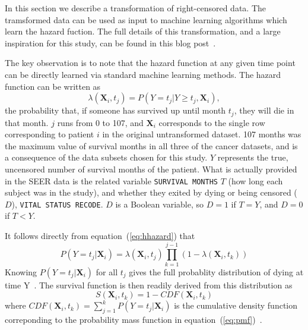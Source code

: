 \documentclass[10pt,letterpaper]{article}
\newcommand{\codewhite}[1]{\colorbox{white}{\texttt{#1}}}
\begin{document}
In this section we describe a transformation of right-censored data. The tramsformed data can be used as input to machine learning algorithms which learn the hazard fuction. The full details of this transformation, and a large inspiration for this study, can be found in this blog post~\cite{kuhn}.


The key observation is to note that the hazard function at any given time point can be directly learned via standard machine learning methods. The hazard function can be written as
\begin{equation}
\label{eq:hhazard}
\lambda(\mathbf{X}_{i}, t_{j}) = P(Y = t_{j}|Y \geq t_{j}, \mathbf{X}_{i}),
\end{equation}
the probability that, if someone has survived up until month $t_{j}$, they will die in that month.
 $j$ runs from 0 to 107, and $\mathbf{X}_{i}$ corresponds to the single row corresponding to patient $i$ in the original untransformed dataset.
107 months was the maximum value of survival months in all three of the cancer datasets, and is a consequence of the data subsets chosen for this study.
$Y$ represents the true, uncensored number of survival months of the patient.
What is actually provided in the SEER data is the related variable \codewhite{SURVIVAL MONTHS} $T$ (how long each subject was in the study), and whether they exited by dying or being censored ($D$), \codewhite{VITAL STATUS RECODE}. 
$D$ is a Boolean variable, so $D = 1$ if $T = Y$, and $D = 0$ if $T < Y$.



It follows directly from equation~(\ref{eq:hhazard}) that 
\begin{equation}
\label{eq:pmf}
P(Y = t_{j} | \mathbf{X}_{i}) = \lambda(\mathbf{X}_{i}, t_{j}) \prod_{k=1}^{j-1} (1 - \lambda(\mathbf{X}_{i}, t_{k}))
\end{equation}
Knowing $P(Y = t_{j} | \mathbf{X}_{i}) $ for all $t_{j}$ gives the 
full probablity distribution of dying at time Y~\cite{kuhn}.
The survival function is then readily derived from this distribution as
\begin{equation}
\label{eq:cdf}
S(\mathbf{X}_{i},t_{k}) = 1 - CDF(\mathbf{X}_{i}, t_{k})
\end{equation}
where $CDF(\mathbf{X}_{i}, t_{k}) = \sum_
{j=1}^{k} P(Y = t_{j} | \mathbf{X}_{i}) $ is the cumulative density function correponding to the probability mass function in equation~(\ref{eq:pmf})~\cite{downey}.
\end{document}
